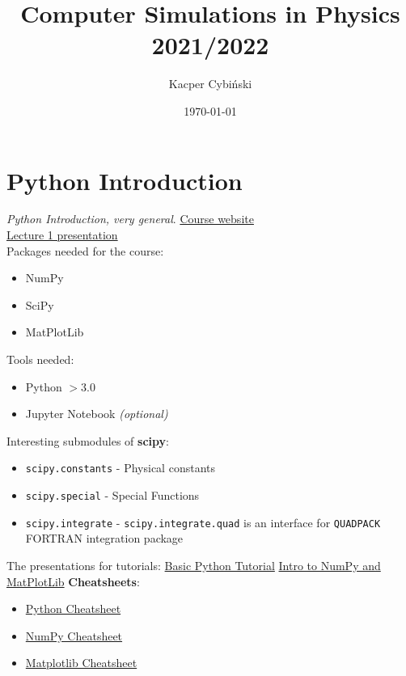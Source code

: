 \documentclass[12pt,a4paper]{report}
\title{Computer Simulations in Physics 2021/2022}
\author{Kacper Cybiński}
\date{\today}
\newcommand{\link}[2]{{\color{cyan} \href{#1}{#2}}}
\newcounter{lec}
\newenvironment{lecture}[1]{\par\medskip
   \noindent\chapter{#1} \rmfamily}{\medskip}
\renewcommand{\emph}{\textbf}
\begin{document}
\maketitle
\thispagestyle{empty}


\begin{lecture}{Python Introduction}
\textit{Python Introduction, very general}.
\href{https://www.fuw.edu.pl/~qba/cmpp2022}{Course website}\\
\href{http://studenci.fuw.edu.pl/~kc427902/CMCS_2022/lect1.pdf}{Lecture 1 presentation}\\
Packages needed for the course:
\begin{itemize}
    \item NumPy
    \item SciPy
    \item MatPlotLib
\end{itemize}
Tools needed:
\begin{itemize}
    \item Python $>3.0$
    \item Jupyter Notebook \textit{(optional)}
\end{itemize}
Interesting submodules of \emph{scipy}:
\begin{itemize}
    \item \verb|scipy.constants| - Physical constants
    \item \verb|scipy.special| - Special Functions
    \item \verb|scipy.integrate| - \verb|scipy.integrate.quad|  is an interface for \verb|QUADPACK| FORTRAN integration package
\end{itemize}
The presentations for tutorials: \href{http://studenci.fuw.edu.pl/~kc427902/CMCS_2022/lab1a.pdf}{Basic Python Tutorial}
\href{http://studenci.fuw.edu.pl/~kc427902/CMCS_2022/lab1b.pdf}{Intro to NumPy and MatPlotLib}
\emph{Cheatsheets}:
\begin{itemize}
    \item \link{http://studenci.fuw.edu.pl/~kc427902/CMCS_2022/python_cs.pdf}{Python Cheatsheet}
    \item \link{http://studenci.fuw.edu.pl/~kc427902/CMCS_2022/numpy_cs.pdf}{NumPy Cheatsheet}
    \item \link{http://studenci.fuw.edu.pl/~kc427902/CMCS_2022/matplot_cs.pdf}{Matplotlib Cheatsheet}
\end{itemize}
\end{lecture}
\end{document}
